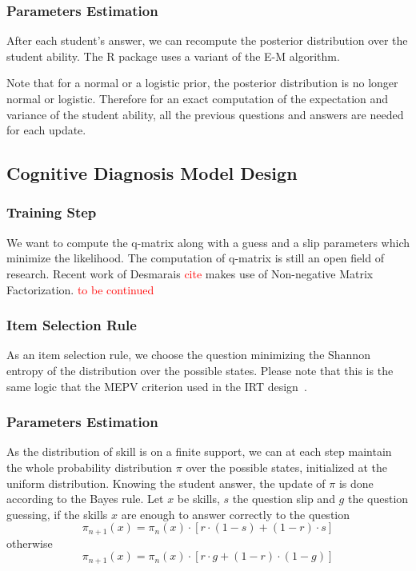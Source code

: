 \documentclass{sig-alternate}
\newcommand\alert[1]{\textcolor{red}{#1}}
\begin{document}
\subsubsection{Parameters Estimation}

After each student's answer, we can recompute the posterior distribution over the student ability. The R package uses a variant of the E-M algorithm. 

Note that for a normal or a logistic prior, the posterior distribution is no longer normal or logistic. Therefore for an exact computation of the expectation and variance of the student ability, all the previous questions and answers are needed for each update. 

\subsection{Cognitive Diagnosis Model Design}

\subsubsection{Training Step}

We want to compute the q-matrix along with a guess and a slip parameters which minimize the likelihood. The computation of q-matrix is still an open field of research. Recent work of Desmarais \alert{cite} makes use of Non-negative Matrix Factorization. \alert{to be continued}

\subsubsection{Item Selection Rule}

As an item selection rule, we choose the question minimizing the Shannon entropy of the distribution over the possible states. Please note that this is the same logic that the MEPV criterion used in the IRT design~\cite{Cheng2009}.

\subsubsection{Parameters Estimation}

As the distribution of skill is on a finite support, we can at each step maintain the whole probability distribution $\pi$ over the possible states, initialized at the uniform distribution.
Knowing the student answer, the update of $\pi$ is done according to the Bayes rule. Let $x$ be skills, $s$ the question slip and $g$ the question guessing, if the skills $x$ are enough to answer correctly to the question
\[ \pi_{n+1}(x) = \pi_n(x) \cdot [r\cdot(1-s) + (1-r)\cdot s] \]
otherwise
\[ \pi_{n+1}(x) = \pi_n(x) \cdot [r\cdot g + (1-r)\cdot(1-g)] \]
\end{document}
